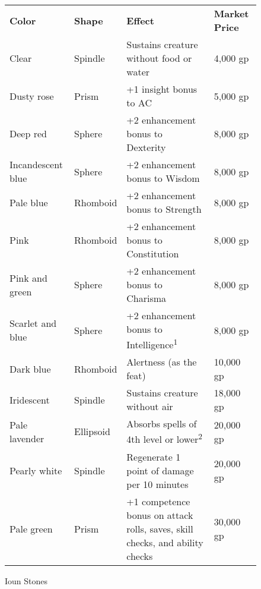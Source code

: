 \begin{figure*}[]
\sffamily
\caption{Ioun Stones}
\begin{tabular}{llll}
\textbf{Color}     & \textbf{Shape} & \textbf{Effect}                                                              & \textbf{Market Price} \\
Clear              & Spindle        & Sustains creature without food or water                                      & 4,000 gp              \\
Dusty rose         & Prism          & +1 insight bonus to AC                                                       & 5,000 gp              \\
Deep red           & Sphere         & +2 enhancement bonus to Dexterity                                            & 8,000 gp              \\
Incandescent blue  & Sphere         & +2 enhancement bonus to Wisdom                                               & 8,000 gp              \\
Pale blue          & Rhomboid       & +2 enhancement bonus to Strength                                             & 8,000 gp              \\
Pink               & Rhomboid       & +2 enhancement bonus to Constitution                                         & 8,000 gp              \\
Pink and green     & Sphere         & +2 enhancement bonus to Charisma                                             & 8,000 gp              \\
Scarlet and blue   & Sphere         & +2 enhancement bonus to Intelligence\textsuperscript{1}                      & 8,000 gp              \\
Dark blue          & Rhomboid       & Alertness (as the feat)                                                      & 10,000 gp             \\
Iridescent         & Spindle        & Sustains creature without air                                                & 18,000 gp             \\
Pale lavender      & Ellipsoid      & Absorbs spells of 4th level or lower\textsuperscript{2}                      & 20,000 gp             \\
Pearly white       & Spindle        & Regenerate 1 point of damage per 10 minutes                                  & 20,000 gp             \\
Pale green         & Prism          & +1 competence bonus on attack rolls, saves, skill checks, and ability checks & 30,000 gp             \\

\end{tabular}
\end{figure*}

